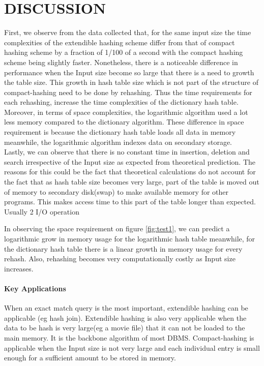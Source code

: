\documentclass[a4paper,12pt, openany]{book}
\begin{document}
\chapter{DISCUSSION}
\label{chap:DISCUSSION}
First, we observe from the data collected that, for the same input size the time complexities of the extendible hashing scheme differ from that of compact hashing scheme by a fraction of 1/100 of a second with the compact hashing scheme being slightly faster. Nonetheless, there is a noticeable difference in performance when the Input size become so large that there is a need to growth the table size. This growth in hash table size which is not part of the structure of compact-hashing need to be done by rehashing. Thus the time requirements for each rehashing, increase the time complexities of the dictionary hash table.\\
Moreover, in terms of space complexities, the logarithmic algorithm used a lot less memory compared to the dictionary algorithm. These difference in space requirement is because the dictionary hash table loads all data in memory meanwhile, the logarithmic algorithm indexes data on secondary storage. \\
Lastly, we can observe that there is no constant time in insertion, deletion and search irrespective of the Input size as expected from theoretical prediction. The reasons for this could be the fact that theoretical calculations do not account for the fact that as hash table size becomes very large, part of the table is moved out of memory to secondary disk(swap) to make available memory for other programs. This makes access time to this part of the table longer than expected. Usually 2 I/O operation 

In observing the space requirement on figure \ref{fig:test1}, we can predict a logarithmic grow in memory usage for the logarithmic hash table meanwhile, for the dictionary hash table there is a linear growth in memory usage for every rehash. Also, rehashing becomes very computationally costly as Input size increases.

\subsubsection{Key Applications }
When an exact match query is the most important, extendible hashing can be applicable (eg hash join).
Extendible hashing is also very applicable when the data to be hash is very large(eg a movie file) that it can not be loaded to the main memory. It is the backbone algorithm of most DBMS.
Compact-hashing is applicable when the Input size is not very large and each individual entry is small enough for a sufficient amount to be stored in memory.
\end{document}
